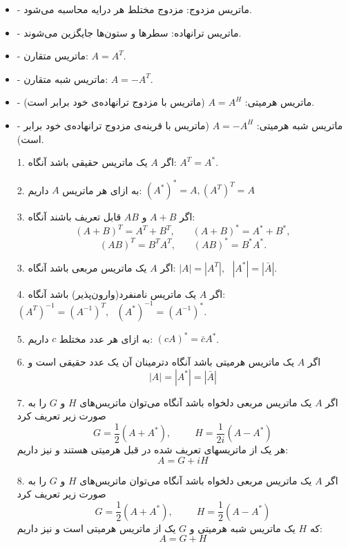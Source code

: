 	\begin{nokteh}
		\begin{itemize}
			\item 
	- ماتریس مزدوج: مزدوج مختلط هر درایه محاسبه می‌شود.
	\item
	- ماتریس ترانهاده: سطرها و ستون‌ها جایگزین می‌شوند.
	\item 
	- ماتریس متقارن: \( A = A^T \).
	\item
	- ماتریس شبه متقارن: \( A = -A^T \).
	\item
	- ماتریس هرمیتی: \( A = A^H \) (ماتریس با مزدوج ترانهاده‌ی خود برابر است).
	\item
	- ماتریس شبه هرمیتی: \( A = -A^H \) (ماتریس با قرینه‌ی مزدوج ترانهاده‌ی خود برابر است).	
		\end{itemize}
	\end{nokteh}
	
	
	
	\begin{nokteh}
\begin{itemize}
	\item [1. ] 
	 اگر 
	$ A $
	یک ماتریس حقیقی باشد آنگاه: 
	$ A^T=A^*$. 
	\item [2. ] 
	به ازای هر ماتریس 
	$A$
	داریم: 
	$(A^*)^*=A , (A^T)^T=A$
	\item [3. ] 
	 اگر 
	 $A+B$
	 و 
	 $AB$
	 قابل تعریف باشند آنگاه:
	 \[ (A+B)^T=A^T+B^T, ~~~~~~~~ (A+B)^*=A^*+B^*,\]
	 \[ (AB)^T=B^TA^T, ~~~~~~~~ (AB)^*=B^*A^* .\]
	 \item [3. ] 
	 اگر 
	 $A$
	 یک ماتریس مربعی باشد آنگاه: 
	 $|A| = |A^T|,~~~ |A^*| = |\bar{A}|$.
	 \item  [4. ] 
	 اگر
	 $A$
	 یک ماتریس نامنفرد(وارون‌پذیر) باشد آنگاه:
	$(A^T)^{-1}=(A^{-1})^T,~~~(A^*)^{-1}=(A^{-1})^*$.
	\item  [5. ] 
	به ازای هر عدد مختلط 
	$c$
	داریم: 
	$(cA)^*=\bar{c}A^*$.
	
	\item  [6. ] 
	اگر
	$A$
	یک ماتریس هرمیتی باشد آنگاه دترمینان آن یک عدد حقیقی است و 
	\[ |A| = |A^*| = |\bar{A}| \]
	\item [7. ] 
	اگر
	$A$
	یک ماتریس مربعی دلخواه باشد آنگاه می‌توان ماتریس‌های
	$H$
	و 
	$G$
	را به صورت زیر تعریف کرد
	\[G=\frac{1}{2}(A+A^*), ~~~~~~~~~~~H=\frac{1}{2i}(A-A^*)\]
	هر یک از ماتریسهای تعریف شده در قبل هرمیتی هستند و نیز داریم:
	\[ A=G+iH \]
	 
	\item [8. ] 
	اگر
	$A$
	یک ماتریس مربعی دلخواه باشد آنگاه می‌توان ماتریس‌های
	$H$
	و 
	$G$
	را به صورت زیر تعریف کرد
	\[G=\frac{1}{2}(A+A^*), ~~~~~~~~~~~H=\frac{1}{2}(A-A^*)\]
	که
		$H$
	یک  ماتریس شبه هرمیتی و 
	$G$
	 یک از ماتریس هرمیتی است و  نیز داریم:
	\[ A=G+H \]
	
\end{itemize}
	\end{nokteh}
	

